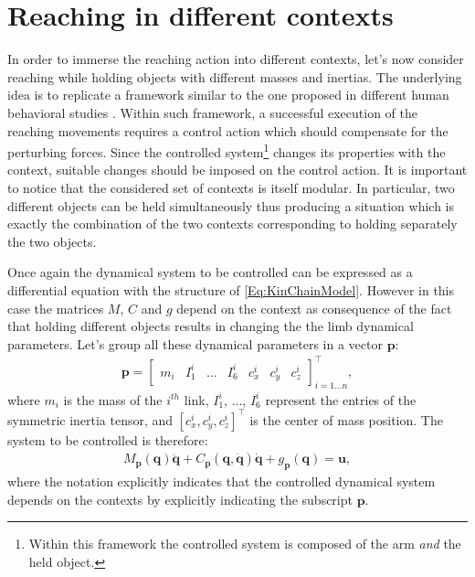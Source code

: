 \documentclass{svmult}
\begin{document}
\section{Reaching in different contexts} \label{Sec:ReachDiffCont}

In order to immerse the reaching action into different contexts,
let's now consider reaching while holding objects with
different masses and inertias. The underlying idea is to 
replicate a framework similar to the one proposed in 
different human behavioral studies \cite{davidson04internal,krakauer99independent}.
Within such framework, a successful
execution of the reaching movements requires a control action which
should compensate for the perturbing forces. Since the controlled
system\footnote{Within this framework the controlled system is
composed of the arm {\em and} the held object.} changes its properties 
with the context, suitable changes should be imposed on the control action.
It is important to notice that the considered set of contexts is itself
modular. In particular, two different objects can be held simultaneously 
thus producing a situation which is exactly the combination of the two 
contexts corresponding to holding separately the two objects.

Once again the dynamical system to be controlled can be expressed as
a differential equation with the structure of \eqref{Eq:KinChainModel}.
However in this case the matrices $M$, $C$ and $g$ depend on the 
context as consequence of the fact that holding different objects
results in changing the the limb dynamical parameters. Let's group all
these dynamical parameters in a vector $\mathbf p$:
\begin{eqnarray}\label{Eq:KinChainContext}
\mathbf p = \begin{bmatrix} m_i & I^i_1 & \dots & I^i_6  & c^i_x & c^i_y & c^i_z
\end{bmatrix}^\top_{i = 1 \dots n},
\end{eqnarray}
where $m_i$ is the mass of the $i^{th}$ link, $I^i_1$, $\dots$,
$I^i_6$ represent the entries of the symmetric inertia tensor, and
$\left[ c^i_x, c^i_y, c^i_z \right]^\top$ is the center of mass position.
The system to be controlled is therefore:
\begin{eqnarray} \label{Eq:KinChainModelContext}
M_{\mathbf p}(\mathbf{q}) \ddot{\mathbf{q}} + C_{\mathbf
p}(\mathbf{q},\dot{\mathbf{q}})\dot{\mathbf{q}} + g_{\mathbf
p}(\mathbf{q}) = \mathbf{u},
\end{eqnarray}
where the notation explicitly indicates that the controlled dynamical system
depends on the contexts by explicitly indicating the subscript 
$\mathbf p$.
\end{document}
